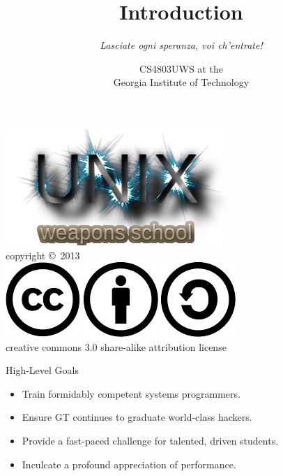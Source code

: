\documentclass{beamer}
\title{\textbf{Introduction}}
\subtitle{{\it Lasciate ogni speranza, voi ch'entrate!}}
\date{}
\author{CS4803UWS at the\\
Georgia Institute of Technology
}
\begin{document}
\begin{frame}
\titlepage
\begin{center}
\includegraphics[scale=0.33]{images/uws.png}\\
\vspace{.1in}
\tiny{copyright \copyright\ 2013}\\
\includegraphics[scale=.25]{images/cc-logo.pdf}
\includegraphics[scale=.25]{images/cc-new.pdf}
\includegraphics[scale=.25]{images/cc-share.pdf}\\
\tiny{creative commons 3.0 share-alike attribution license}
\end{center}
\end{frame}

\begin{frame}{High-Level Goals}
\begin{itemize}
\item Train formidably competent systems programmers.
\item Ensure GT continues to graduate world-class hackers.
\item Provide a fast-paced challenge for talented, driven students. 
\item Inculcate a profound appreciation of performance.
\end{itemize}
\end{frame}
\end{document}
